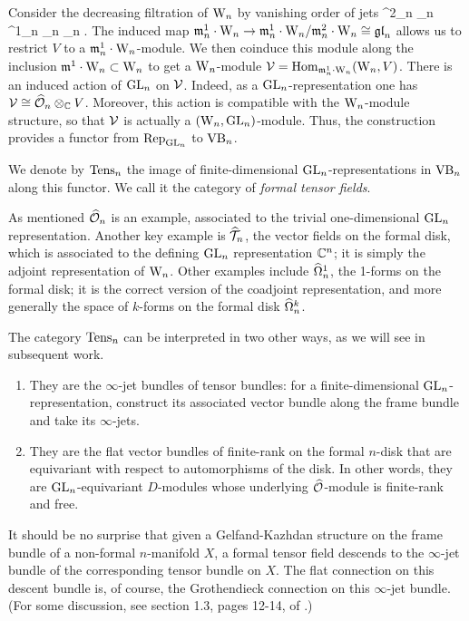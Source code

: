Consider the decreasing filtration of ${{\rm W}_n}$ by vanishing order of jets 
\ben
\cdots \subset \fm^{2}_n _{n} \subset \fm^1_n _n _n .
\een 
The induced map ${\mathfrak m}_n^1 \cdot {{\rm W}_n} \to {\mathfrak m}_n^1 \cdot {{\rm W}_n} / {\mathfrak m}_n^2
\cdot {{\rm W}_n} \cong {\mathfrak{gl}}_n$ allows us to restrict $V$ to a ${\mathfrak m}_n^1 \cdot
{{\rm W}_n}$-module. 
We  then coinduce this module along the inclusion ${\mathfrak m}^1 \cdot {{\rm W}_n}
\subset {{\rm W}_n}$ to get a ${{\rm W}_n}$-module $\mathcal{V} = {\rm Hom}_{{\mathfrak m}_n^1 \cdot {{\rm W}_n}}({{\rm W}_n},V)$. 
There is an induced action of ${\rm GL}_n$ on $\mathcal{V}$. Indeed, as a ${\rm GL}_n$-representation one has $\mathcal{V} \cong \widehat{\mathcal O}_n \otimes_{\mathbb C} V$.
Moreover, this action is compatible with the ${{\rm W}_n}$-module structure, so that $\mathcal{V}$ is actually a $({{\rm W}_n}, {\rm GL}_n)$-module. 
Thus, the construction provides a functor  from ${\rm Rep}_{{\rm GL}_n}$ to
${\rm VB}_n$.

\begin{dfn} 
We denote by ${\rm Tens}_n$ the image of finite-dimensional ${\rm GL}_n$-representations in ${\rm VB}_n$ along this functor. 
We call it the category of {\em formal tensor fields}.
\end{dfn}

As mentioned $\widehat{\mathcal O}_n$ is an example, associated to the trivial one-dimensional ${\rm GL}_n$ representation.
Another key example is $\widehat{\mathcal T}_n$, the vector fields on the formal disk, which is associated to the defining ${\rm GL}_n$ representation $\mathbb C^n$; 
it is simply the adjoint representation of ${{\rm W}_n}$.
Other examples include $\widehat{\Omega}^1_n$, the 1-forms on the formal disk; it
is the correct version of the coadjoint representation, and more
generally the space of $k$-forms on the formal disk $\widehat{\Omega}^k_n$. 

The category ${\rm Tens}_n$ can be interpreted in two other ways, as we will see in subsequent work.
\begin{enumerate}
\item They are the $\infty$-jet bundles of tensor bundles: for a finite-dimensional ${\rm GL}_n$-representation, 
construct its associated vector bundle along the frame bundle and take its $\infty$-jets.
\item They are the flat vector bundles of finite-rank on the formal $n$-disk that are equivariant with respect to automorphisms of the disk. 
In other words, they are ${\rm GL}_n$-equivariant $D$-modules whose underlying $\widehat{\mathcal O}$-module is finite-rank and free.
\end{enumerate}
It should be no surprise that given a Gelfand-Kazhdan structure on the frame bundle of a non-formal $n$-manifold $X$, 
a formal tensor field descends to the $\infty$-jet bundle of the corresponding tensor bundle on $X$. 
The flat connection on this descent bundle is, of course, the Grothendieck connection on this $\infty$-jet bundle. 
(For some discussion, see section 1.3, pages 12-14, of \cite{Fuks}.)

